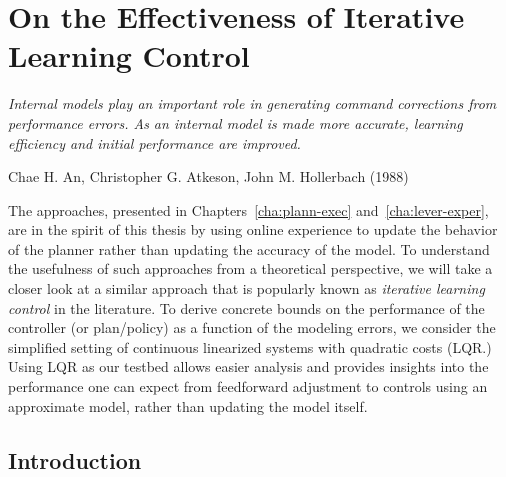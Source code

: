 \chapter{On the Effectiveness of Iterative Learning Control}
\label{cha:ilc}

\epigraph{\textit{Internal models play an important role in generating
    command corrections from performance errors. As an internal model
    is made more accurate, learning efficiency and initial performance
    are improved.}}{Chae H. An, Christopher G. Atkeson, John
  M. Hollerbach (1988)}

The approaches, presented in Chapters~\ref{cha:plann-exec}
and~\ref{cha:lever-exper}, are 
in the spirit of this thesis by using online experience to update the
behavior of the planner rather than updating the accuracy of the
model. To understand the usefulness of such approaches from a
theoretical perspective, we will take a closer look at a similar
approach that is popularly known as \textit{iterative learning
  control} in the literature. To derive concrete bounds on the
performance of the controller (or plan/policy) as a function of the
modeling errors, we consider the simplified setting of continuous
linearized systems with quadratic costs (LQR.) Using LQR as our
testbed allows easier analysis and provides insights into the
performance one can expect from feedforward adjustment to controls
using an approximate model, rather than updating the model itself.

\section{Introduction}
\label{sec:intro}

